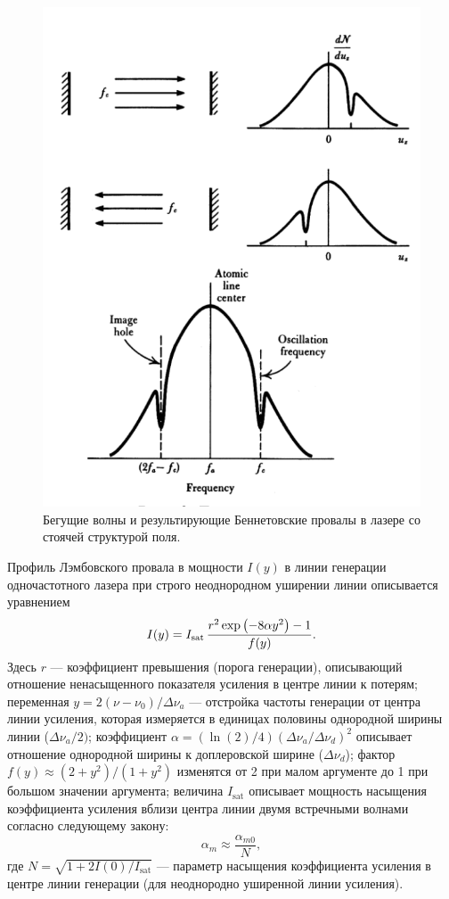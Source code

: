 \documentclass[12pt, russian, a4paper]{article}
\begin{document}
	\begin{figure}[htbp]
		\centering
		\includegraphics[scale=0.5]{bennet-failure.png}
		\caption{Бегущие волны и результирующие Беннетовские провалы в лазере со стоячей структурой поля.}
		\label{fig:bennet-failure}
	\end{figure}

	Профиль Лэмбовского провала в мощности $I(y)$ в линии генерации одночастотного лазера при строго неоднородном уширении линии описывается уравнением
	\begin{equation}\label{eq:I_y}
		I(y) = I_\text{sat}\, \dfrac{r^2 \exp\qty(-8\alpha y^2) - 1}{f(y)}.
	\end{equation}
	Здесь $r$ --- коэффициент превышения (порога генерации), описывающий отношение ненасыщенного показателя усиления в центре линии к потерям; переменная $y = 2 (\nu-\nu_0)/\Delta\nu_a$ --- отстройка частоты генерации от центра линии усиления, которая измеряется в единицах половины однородной ширины линии ($\Delta\nu_a/2)$; коэффициент $\alpha=(\ln(2) / 4)(\Delta\nu_a / \Delta\nu_d)^2$ описывает отношение однородной ширины к доплеровской ширине ($\Delta\nu_d$); фактор $f(y) \approx (2+y^2)/ (1+y^2)$ изменятся от 2 при малом аргументе до 1 при большом значении аргумента; величина $I_\text{sat}$ описывает мощность насыщения коэффициента усиления вблизи центра линии двумя встречными волнами согласно следующему закону:
	\begin{equation}
		\alpha_m \approx \dfrac{\alpha_{m0}}{N},
	\end{equation}
	где $N = \sqrt{1 + 2I(0)/I_\text{sat}}$ --- параметр насыщения коэффициента усиления в центре линии генерации (для неоднородно уширенной линии усиления).
\end{document}
